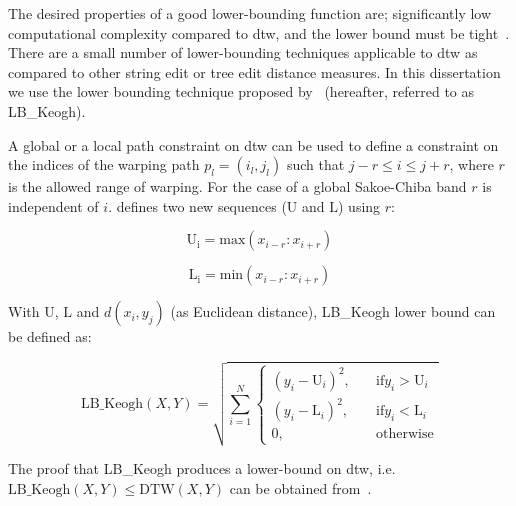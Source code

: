 The desired properties of a good lower-bounding function are; significantly low computational complexity compared to \gls{dtw}, and the lower bound must be tight~\citep{Keogh2004}. There are a small number of lower-bounding techniques applicable to \gls{dtw} as compared to other string edit or tree edit distance measures. In this dissertation we use the lower bounding technique proposed by~\cite{Keogh2004} (hereafter, referred to as LB\_Keogh). 

A global or a local path constraint on \gls{dtw} can be used to define a constraint on the indices of the warping path $p_l = (i_l, j_l)$ such that $j-r \leq i \leq j+r$, where $r$ is the allowed range of warping. For the case of a global Sakoe-Chiba band $r$ is independent of $i$. \cite{Keogh2004} defines two new sequences ($\mathrm{U}$ and $\mathrm{L}$) using $r$:

\begin{equation}
	\mathrm{U_i} = \mathrm{max}(x_{i-r}:x_{i+r})
\end{equation}

\begin{equation}
\mathrm{\mathrm{L}_i} = \mathrm{min}(x_{i-r}:x_{i+r})
\end{equation}

With $\mathrm{U}$, $\mathrm{L}$ and $d(x_i, y_j)$ (as Euclidean distance), LB\_Keogh lower bound can be defined as:

\begin{equation}
	\mathrm{LB\_Keogh}(X,Y) = \sqrt{\sum_{i=1}^{N}{\begin{cases}
			(y_i - \mathrm{U}_i)^2, & \quad \text{if} y_i > \mathrm{U}_i\\
			(y_i - \mathrm{L}_i)^2, & \quad \text{if} y_i < \mathrm{L}_i\\			
			0, & \quad \mathrm{otherwise}			
			\end{cases}}}
\end{equation}

The proof that LB\_Keogh produces a lower-bound on \gls{dtw}, i.e.~$\mathrm{LB\_Keogh}(X,Y) \leq \mathrm{DTW}(X,Y)$ can be obtained from~\cite{Keogh2004}.



